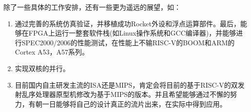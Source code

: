 	除了一些具体的工作安排，还有一些更为遥远的展望，如：
	\begin{enumerate}[label=(\arabic*)]
		\item 通过完善的系统仿真验证，并移植成功Rocket外设和浮点运算部件。最后，能够在FPGA上运行一整套软件栈(如Linux操作系统和GCC编译器)，并能够进行SPEC2000/2006的性能测试，在性能上不输RISC-V的BOOM和ARM的Cortex A53，A57系列。
		\item 实现双核的并行。
		\item 目前国内自主研发主流的ISA还是MIPS，肯定会将目前的基于RISC-V的双发射乱序处理器原型机修改为基于MIPS的版本。并且希望能够通过不懈的努力，有朝一日能够将自己的设计真正的流片出来，在实际中得到应用。
	\end{enumerate}
	
	